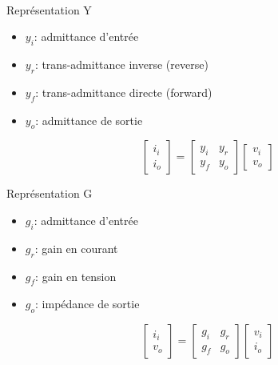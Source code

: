 \paragraph*{}
\begin{minipage}[c]{9cm}
\begin{center}Représentation Y\end{center}
\begin{itemize}
\item $y_i$: admittance d'entrée
\item $y_r$: trans-admittance inverse (reverse)
\item $y_f$: trans-admittance directe (forward)
\item $y_o$: admittance de sortie
\end{itemize}
\vspace{0.5cm}
\[
\begin{bmatrix}
i_i\\
i_o
\end{bmatrix}
=
\begin{bmatrix}
y_i & y_r\\
y_f & y_o
\end{bmatrix}
\begin{bmatrix}
v_i\\
v_o
\end{bmatrix}
\]
\end{minipage}
\begin{minipage}[c]{9cm}
\begin{center}Représentation G\end{center}
\begin{itemize}
\item $g_i$: admittance d'entrée
\item $g_r$: gain en courant
\item $g_f$: gain en tension
\item $g_o$: impédance de sortie
\end{itemize}
\vspace{0.5cm}
\[
\begin{bmatrix}
i_i\\
v_o
\end{bmatrix}
=
\begin{bmatrix}
g_i & g_r\\
g_f & g_o
\end{bmatrix}
\begin{bmatrix}
v_i\\
i_o
\end{bmatrix}
\]
\end{minipage}
